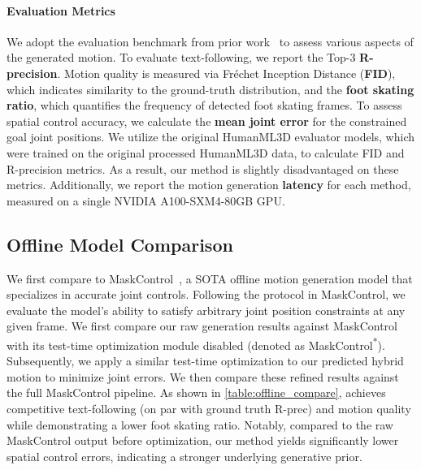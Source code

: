 \paragraph{Evaluation Metrics}
We adopt the evaluation benchmark from prior work~\cite{guo2022humanml3d,pinyoanuntapong2025MaskControl} to assess various aspects of the generated motion. To evaluate text-following, we report the Top-3 \textbf{R-precision}. Motion quality is measured via Fréchet Inception Distance (\textbf{FID}), which indicates similarity to the ground-truth distribution, and the \textbf{foot skating ratio}, which quantifies the frequency of detected foot skating frames. To assess spatial control accuracy, we calculate the \textbf{mean joint error} for the constrained goal joint positions.
We utilize the original HumanML3D evaluator models, which were trained on the original processed HumanML3D data, to calculate FID and R-precision metrics. As a result, our method is slightly disadvantaged on these metrics.
Additionally, we report the motion generation \textbf{latency} for each method, measured on a single NVIDIA A100-SXM4-80GB GPU.


\subsection{Offline Model Comparison}

We first compare to MaskControl~\cite{pinyoanuntapong2025MaskControl}, a SOTA offline motion generation model that specializes in accurate joint controls. 
Following the protocol in MaskControl, we evaluate the model's ability to satisfy arbitrary joint position constraints at any given frame.
We first compare our raw generation results against MaskControl with its test-time optimization module disabled (denoted as MaskControl\textsuperscript{*}). Subsequently, we apply a similar test-time optimization to our predicted hybrid motion to minimize joint errors. We then compare these refined results against the full MaskControl pipeline. As shown in \cref{table:offline_compare}, \method achieves competitive text-following (on par with ground truth R-prec) and motion quality while demonstrating a lower foot skating ratio. Notably, compared to the raw MaskControl output before optimization, our method yields significantly lower spatial control errors, indicating a stronger underlying generative prior.


